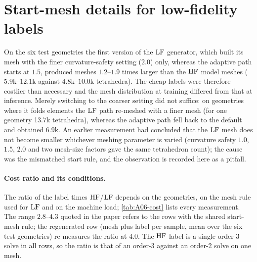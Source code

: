 \section{Start-mesh details for low-fidelity labels}\label{sec:A06-meshes}

On the six test geometries the first version of the $\mathrm{LF}$ generator, which built its mesh with the finer curvature-safety
setting ($2.0$) only, whereas the adaptive path starts at $1.5$, produced meshes $1.2$--$1.9$ times larger than the
$\mathrm{HF}$ model meshes ($5.9$k--$12.1$k against $4.8$k--$10.0$k tetrahedra). The cheap labels were therefore costlier than
necessary and the mesh distribution at training differed from that at inference.
Merely switching to the coarser setting did not suffice: on geometries where it folds elements the $\mathrm{LF}$ path re-meshed
with a finer mesh (for one geometry 13.7k tetrahedra), whereas the adaptive path fell back to the default and obtained
6.9k.
An earlier measurement had concluded that the $\mathrm{LF}$ mesh does not become smaller whichever meshing parameter is varied
(curvature safety $1.0$, $1.5$, $2.0$ and two mesh-size factors gave the same tetrahedron count); the cause was the
mismatched start rule, and the observation is recorded here as a pitfall.

\paragraph{Cost ratio and its conditions.} The ratio of the label times $\mathrm{HF}$/$\mathrm{LF}$ depends on the geometries, on the
mesh rule used for $\mathrm{LF}$ and on the machine load; \cref{tab:A06-cost} lists every measurement. The range $2.8$--$4.3$
quoted in the paper refers to the rows with the shared start-mesh rule; the regenerated row
(mesh plus label per sample, mean over the six test geometries) re-measures the ratio at $4.0$. The $\mathrm{HF}$ label is a single order-3 solve in all
rows, so the ratio is that of an order-3 against an order-2 solve on one mesh.

